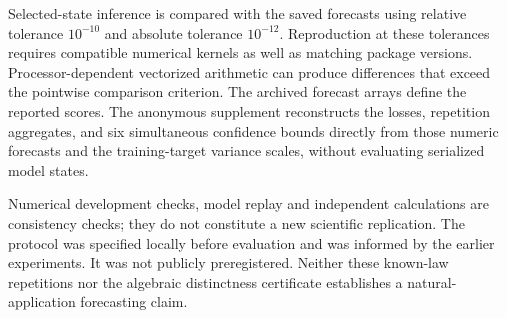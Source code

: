 Selected-state inference is compared with the saved forecasts using relative
tolerance $10^{-10}$ and absolute tolerance $10^{-12}$. Reproduction at these
tolerances requires compatible numerical kernels as well as matching package
versions. Processor-dependent vectorized arithmetic can produce differences
that exceed the pointwise comparison criterion. The archived forecast arrays
define the reported scores. The anonymous supplement reconstructs the losses,
repetition aggregates, and six simultaneous confidence bounds directly from
those numeric forecasts and the training-target variance scales, without
evaluating serialized model states.

Numerical
development checks, model replay and independent calculations are consistency
checks; they do not constitute a new scientific replication. The protocol was specified locally before evaluation and was informed
by the earlier experiments. It was not publicly preregistered. Neither these known-law repetitions nor the algebraic
distinctness certificate establishes a natural-application forecasting claim.
